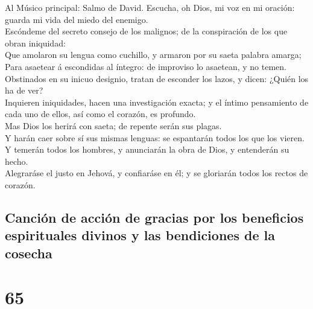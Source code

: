  Al Músico principal: Salmo de David. Escucha, oh Dios, mi
voz en mi oración: guarda mi vida del miedo del enemigo.\\
 Escóndeme del secreto consejo de los malignos; de la
conspiración de los que obran iniquidad:\\
 Que amolaron su lengua como cuchillo, y armaron por su
saeta palabra amarga;\\
 Para asaetear á escondidas al íntegro: de improviso lo
asaetean, y no temen.\\
 Obstinados en su inicuo designio, tratan de esconder los
lazos, y dicen: ¿Quién los ha de ver?\\
 Inquieren iniquidades, hacen una investigación exacta; y
el íntimo pensamiento de cada uno de ellos, así como el corazón, es
profundo.\\
 Mas Dios los herirá con saeta; de repente serán sus
plagas.\\
 Y harán caer sobre sí sus mismas lenguas: se espantarán
todos los que los vieren.\\
 Y temerán todos los hombres, y anunciarán la obra de
Dios, y entenderán su hecho.\\
 Alegraráse el justo en Jehová, y confiaráse en él; y se
gloriarán todos los rectos de corazón.

\hypertarget{canciuxf3n-de-acciuxf3n-de-gracias-por-los-beneficios-espirituales-divinos-y-las-bendiciones-de-la-cosecha}{%
\subsection{Canción de acción de gracias por los beneficios espirituales
divinos y las bendiciones de la
cosecha}\label{canciuxf3n-de-acciuxf3n-de-gracias-por-los-beneficios-espirituales-divinos-y-las-bendiciones-de-la-cosecha}}

\hypertarget{section-19-65}{%
\section{65}\label{section-19-65}}

